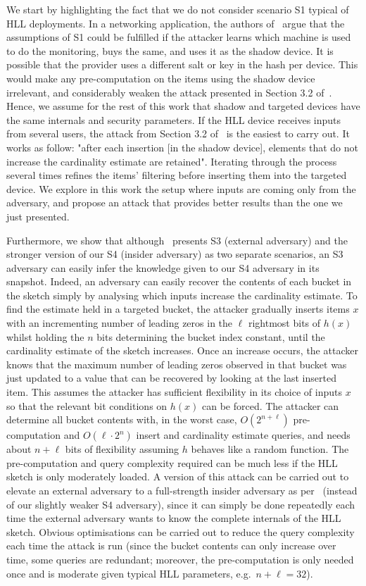 \documentclass[11pt]{article}
\begin{document}
We start by highlighting the fact that we do not consider scenario S1 typical of HLL deployments. In a networking application, the authors of~\cite{hllvuln} argue that the assumptions of S1 could be fulfilled if the attacker learns which machine is used to do the monitoring, buys the same, and uses it as the shadow device. It is possible that the provider uses a different salt or key in the hash per device. This would make any pre-computation on the items using the shadow device irrelevant, and considerably weaken the attack presented in Section 3.2 of~\cite{hllvuln}. Hence, we assume for the rest of this work that shadow and targeted devices have the same internals and security parameters. If the HLL device receives inputs from several users, the attack from Section 3.2 of~\cite{hllvuln} is the easiest to carry out. It works as follow: "after each insertion [in the shadow device], elements that do not increase the cardinality estimate are retained". Iterating through the process several times refines the items' filtering before inserting them into the targeted device. We explore in this work the setup where inputs are coming only from the adversary, and propose an attack that provides better results than the one we just presented. 

Furthermore, we show that although~\cite{cardestprivacy} presents S3 (external adversary) and the stronger version of our S4 (insider adversary) as two separate scenarios, an S3 adversary can easily infer the knowledge given to our S4 adversary in its snapshot. Indeed, an adversary can easily recover the contents of each bucket in the sketch simply by analysing which inputs increase the cardinality estimate. To find the estimate held in a targeted bucket, the attacker gradually inserts items $x$ with an incrementing number of leading zeros in the $\ell$ rightmost bits of $h(x)$ whilst holding the $n$ bits determining the bucket index constant, until the cardinality estimate of the sketch increases. Once an increase occurs, the attacker knows that the maximum number of leading zeros observed in that bucket was just updated to a value that can be recovered by looking at the last inserted item. This assumes the attacker has sufficient flexibility in its choice of inputs $x$ so that the relevant bit conditions on $h(x)$ can be forced. The attacker can determine all bucket contents with, in the worst case, $O(2^{n + \ell})$ pre-computation and $O(\ell \cdot 2^{n})$ insert and cardinality estimate queries, and needs about $n + \ell$ bits of flexibility assuming $h$ behaves like a random function. The pre-computation and query complexity required can be much less if the HLL sketch is only moderately loaded. A version of this attack can be carried out to elevate an external adversary to a full-strength insider adversary as per~\cite{cardestprivacy} (instead of our slightly weaker S4 adversary), since it can simply be done repeatedly each time the external adversary wants to know the complete internals of the HLL sketch. Obvious optimisations can be carried out to reduce the query complexity each time the attack is run (since the bucket contents can only increase over time, some queries are redundant; moreover, the pre-computation is only needed once and is moderate given typical HLL parameters, e.g.\ $n+\ell = 32$).
\end{document}
